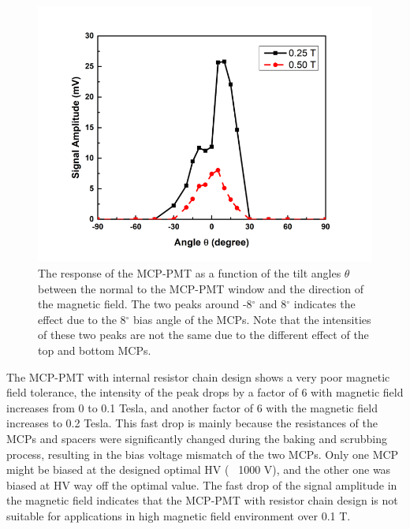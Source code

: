 \documentclass[preprint,5p]{elsarticle}
\begin{document}
\begin{figure}[tbp]
\centering \includegraphics[scale=0.7]{fig/LeXcUD.png}
\caption{The response of the MCP-PMT as a function of the tilt angles $\theta$ 
   between the normal to the MCP-PMT window and the direction of the magnetic 
   field.  The two peaks around -8$^{\circ}$ and 8$^{\circ}$ indicates the 
   effect due to the 8$^{\circ}$ bias angle of the MCPs. Note that the 
   intensities of these two peaks are not the same due to the different effect 
   of the top and bottom MCPs. } \label{fig:design}
\end{figure}

The MCP-PMT with internal resistor chain design shows a very poor magnetic 
field tolerance, the intensity of the peak drops by a factor of 6 with magnetic 
field increases from 0 to 0.1 Tesla, and another factor of 6 with the magnetic 
field increases to 0.2 Tesla. This fast drop is mainly because the resistances 
of the MCPs and spacers were significantly changed during the baking and 
scrubbing process, resulting in the bias voltage mismatch of the two MCPs. Only 
one MCP might be biased at the designed optimal HV (~ 1000 V), and the other 
one was biased at HV way off the optimal value. The fast drop of the signal 
amplitude in the magnetic field indicates that the MCP-PMT with resistor chain 
design is not suitable for applications in high magnetic field environment over 
0.1 T. 
\end{document}
